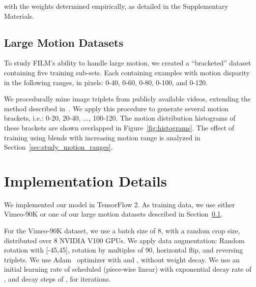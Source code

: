 \documentclass[runningheads]{llncs}
\begin{document}
with the weights  determined empirically, as detailed in the Supplementary Materials.

\subsection{Large Motion Datasets}
\label{sec:training_datasets}
To study FILM’s ability to handle large motion, we created a ``bracketed'' dataset containing five training sub-sets. Each containing examples with motion disparity in the following ranges, in pixels: 0-40, 0-60, 0-80, 0-100, and 0-120.

We procedurally mine  image triplets from publicly available videos, extending the method described in~\cite{moblur-2019}. 
We apply this procedure to generate several motion brackets, i.e.: 0-20, 20-40, ..., 100-120. The motion distribution histograms of these brackets are shown overlapped in Figure~\ref{fig:histograms}. The effect of training using blends with increasing motion range is analyzed in Section~\ref{sec:study_motion_ranges}.

\begin{figure*}[ht!]
    \hspace{4ex}
    \centering
    \enspace
    \enspace
    \caption{Motion magnitude histograms of datasets Vimeo-90K (\ref{fig:sub1}), Xiph-4K (\ref{fig:sub2}) and Bracketed (\ref{fig:sub3}).}
    \label{fig:histograms}
    \vspace{-6ex}
\end{figure*} \section{Implementation Details}
\label{sec:implementation}
We implemented our model in TensorFlow 2. As training data, we use either Vimeo-90K or one of our large motion datasets described in Section~\ref{sec:training_datasets}. 

For the Vimeo-90K dataset, we use a batch size of 8, with a  random crop size, distributed over 8 NVIDIA V100 GPUs. We apply data augmentation: Random rotation with [-45,45], rotation by multiples of 90, horizontal flip, and reversing triplets. We use Adam~\cite{adam-optimizer} optimizer with  and , without weight decay. We use an initial learning rate of  scheduled (piece-wise linear) with exponential decay rate of , and decay steps of , for  iterations.
\end{document}
